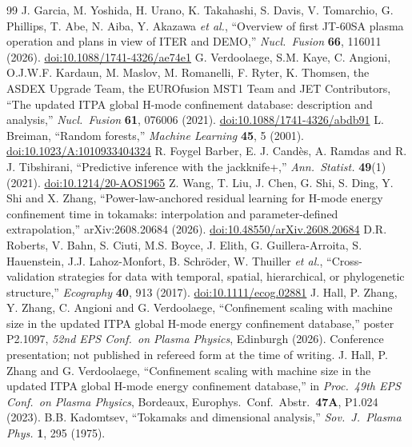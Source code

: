 \documentclass[12pt,letterpaper]{article}
\begin{document}
\begin{thebibliography}{99}
 J. Garcia, M. Yoshida, H. Urano, K. Takahashi, S. Davis, V. Tomarchio,
G. Phillips, T. Abe, N. Aiba, Y. Akazawa \emph{et al.},
``Overview of first JT-60SA plasma
operation and plans in view of ITER and DEMO,'' \emph{Nucl.\ Fusion} \textbf{66},
116011 (2026).
\href{https://doi.org/10.1088/1741-4326/ae74e1}{doi:10.1088/1741-4326/ae74e1}
 G. Verdoolaege, S.M. Kaye, C. Angioni, O.J.W.F. Kardaun, M. Maslov,
M. Romanelli, F. Ryter, K. Thomsen, the ASDEX Upgrade Team, the EUROfusion
MST1 Team and JET Contributors, ``The updated ITPA global H-mode
confinement database: description and analysis,'' \emph{Nucl.\ Fusion}
\textbf{61}, 076006 (2021).
\href{https://doi.org/10.1088/1741-4326/abdb91}{doi:10.1088/1741-4326/abdb91}
 L. Breiman, ``Random forests,'' \emph{Machine Learning}
\textbf{45}, 5 (2001).
\href{https://doi.org/10.1023/A:1010933404324}{doi:10.1023/A:1010933404324}
 R. Foygel Barber, E. J. Cand\`{e}s, A. Ramdas and R. J.
Tibshirani, ``Predictive inference with the jackknife+,'' \emph{Ann.\ Statist.}
\textbf{49}(1) (2021).
\href{https://doi.org/10.1214/20-AOS1965}{doi:10.1214/20-AOS1965}
 Z. Wang, T. Liu, J. Chen, G. Shi, S. Ding, Y. Shi and X. Zhang,
``Power-law-anchored residual learning
for H-mode energy confinement time in tokamaks: interpolation and
parameter-defined extrapolation,'' arXiv:2608.20684 (2026).
\href{https://doi.org/10.48550/arXiv.2608.20684}{doi:10.48550/arXiv.2608.20684}
 D.R. Roberts, V. Bahn, S. Ciuti, M.S. Boyce, J. Elith, G. Guillera-Arroita,
S. Hauenstein, J.J. Lahoz-Monfort, B. Schr\"{o}der, W. Thuiller \emph{et al.},
``Cross-validation strategies for
data with temporal, spatial, hierarchical, or phylogenetic structure,''
\emph{Ecography} \textbf{40}, 913 (2017).
\href{https://doi.org/10.1111/ecog.02881}{doi:10.1111/ecog.02881}
 J. Hall, P. Zhang, Y. Zhang, C. Angioni and G. Verdoolaege,
``Confinement scaling with machine size in the updated ITPA global H-mode
energy confinement database,'' poster P2.1097, \emph{52nd EPS Conf.\ on Plasma
Physics}, Edinburgh (2026). Conference presentation; not published in refereed
form at the time of writing.
 J. Hall, P. Zhang and G. Verdoolaege, ``Confinement scaling with
machine size in the updated ITPA global H-mode energy confinement database,'' in
\emph{Proc.\ 49th EPS Conf.\ on Plasma Physics}, Bordeaux, Europhys.\ Conf.\
Abstr.\ \textbf{47A}, P1.024 (2023).
 B.B. Kadomtsev, ``Tokamaks and dimensional analysis,''
\emph{Sov.\ J.\ Plasma Phys.} \textbf{1}, 295 (1975).

\end{thebibliography}
\end{document}
